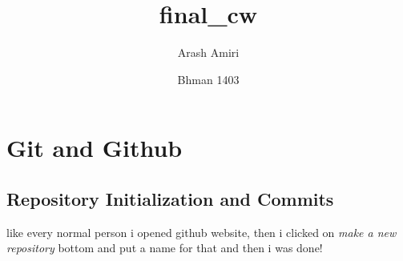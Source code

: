 \documentclass[titlepage]{article}
\title{final\_cw}
\author{Arash Amiri}
\date{Bhman 1403}
\begin{document}
\maketitle
\tableofcontents
\newpage
\section{Git and Github}
\subsection{Repository Initialization and Commits}
like every normal person i opened github website, then i clicked on \textit{make a new repository} bottom and put a name for that and then i was done!
\end{document}
